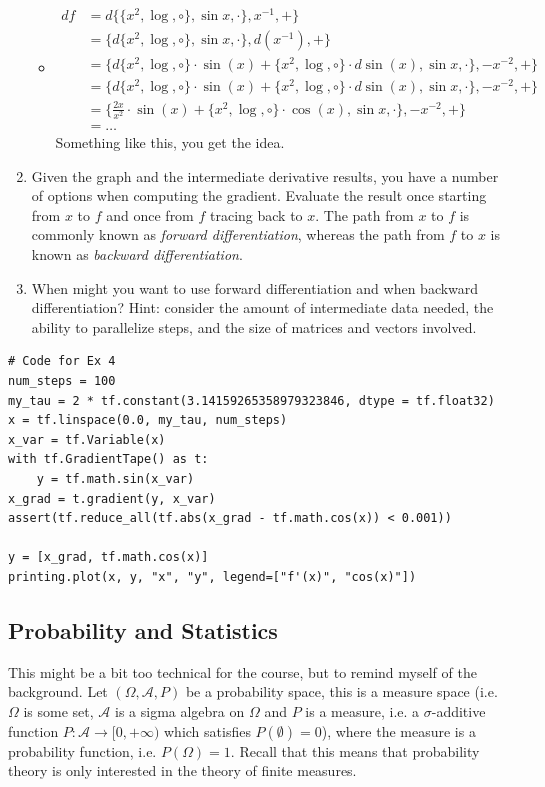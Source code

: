 \documentclass{article}
\begin{document}
\begin{enumerate}
	\begin{itemize}
		\item
		$$
		\begin{aligned}
		df &= d\{\{x^2, \log, \circ\}, \sin x, \cdot\}, x^{-1}, +\} \\
		&= \{d\{x^2, \log, \circ\}, \sin x, \cdot\}, d(x^{-1}),+\} \\
		&= \{d\{x^2, \log, \circ\} \cdot \sin(x) + \{x^2, \log, \circ\} \cdot d\sin(x), \sin x, \cdot\}, -x^{-2},+\} \\
		&= \{d\{x^2, \log, \circ\} \cdot \sin(x) + \{x^2, \log, \circ\} \cdot d\sin(x), \sin x, \cdot\}, -x^{-2},+\} \\
		&= \{\frac{2x}{x^2} \cdot \sin(x) + \{x^2, \log, \circ\} \cdot \cos(x), \sin x, \cdot\}, -x^{-2},+\} \\
		&= \dots
		\end{aligned}
		$$
		Something like this, you get the idea.
	\end{itemize}
\item Given the graph and the intermediate derivative results, you have a number of options when computing the gradient. Evaluate the result once starting from $x$ to $f$ and once from $f$ tracing back to $x$. The path from $x$ to $f$ is commonly known as \textit{forward differentiation}, whereas the path from $f$ to $x$ is known as \textit{backward differentiation}.
\item When might you want to use forward differentiation and when backward differentiation? Hint: consider the amount of intermediate data needed, the ability to parallelize steps, and the size of matrices and vectors involved.
\end{enumerate}

\begin{verbatim}
# Code for Ex 4
num_steps = 100
my_tau = 2 * tf.constant(3.14159265358979323846, dtype = tf.float32)
x = tf.linspace(0.0, my_tau, num_steps)
x_var = tf.Variable(x)
with tf.GradientTape() as t:
    y = tf.math.sin(x_var)
x_grad = t.gradient(y, x_var)
assert(tf.reduce_all(tf.abs(x_grad - tf.math.cos(x)) < 0.001))

y = [x_grad, tf.math.cos(x)]
printing.plot(x, y, "x", "y", legend=["f'(x)", "cos(x)"])
\end{verbatim}

\subsection{Probability and Statistics}
This might be a bit too technical for the course, but to remind myself of the background. Let $(\Omega, \mathcal{A}, P)$ be a probability space, this is a measure space (i.e. $\Omega$ is some set, $\mathcal{A}$ is a sigma algebra on $\Omega$ and $P$ is a measure, i.e. a $\sigma$-additive function $P : \mathcal{A} \rightarrow [0, +\infty)$ which satisfies $P(\emptyset) = 0$), where the measure is a probability function, i.e. $P(\Omega) = 1$. Recall that this means that probability theory is only interested in the theory of finite measures.
\end{document}
